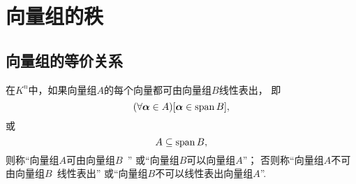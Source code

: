 \section{向量组的秩}
\subsection{向量组的等价关系}
\begin{definition}\label{definition:向量空间.线性表出2}
在\(K^n\)中，如果向量组\(A\)的每个向量都可由向量组\(B\)线性表出，
即\begin{equation*}
	(\forall \boldsymbol\alpha \in A)[\boldsymbol\alpha \in \operatorname{span} B],
\end{equation*}或\begin{equation*}
	A\subseteq\operatorname{span} B,
\end{equation*}
则称“向量组\(A\)可由向量组\(B\)~”
或“向量组\(B\)可以向量组\(A\)”；
否则称“向量组\(A\)不可由向量组\(B\)~线性表出”
或“向量组\(B\)不可以线性表出向量组\(A\)”.
\end{definition}


